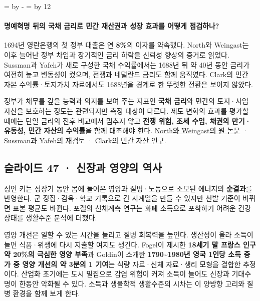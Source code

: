 \documentclass[10pt,a4paper]{article}
\newcommand{\ReserveQuestionSpace}{%
  \par\begingroup
  \dimen0=\pagegoal \advance\dimen0 by -\pagetotal
  \dimen2=\baselineskip \multiply\dimen2 by 12
  \ifdim\dimen0<\dimen2 \newpage\fi
  \endgroup}
\begin{document}
\ReserveQuestionSpace
\paragraph{명예혁명 뒤의 국채 금리로 민간 재산권과 성장 효과를 어떻게 점검하나?}
1694년 영란은행의 첫 정부 대출은 연 \textbf{8\%}의 이자를 약속했다. North와 Weingast는 이후 늘어난 정부 차입과 장기적인 금리 하락을 신뢰성 향상의 증거로 읽었다. Sussman과 Yafeh가 새로 구성한 국채 수익률에서는 1688년 뒤 약 40년 동안 금리가 여전히 높고 변동성이 컸으며, 전쟁과 네덜란드 금리도 함께 움직였다. Clark의 민간 자본 수익률·토지가치 자료에서도 1688년을 경계로 한 뚜렷한 전환은 보이지 않았다.\par

정부가 채무를 갚을 능력과 의지를 보여 주는 지표인 \textbf{국채 금리}와 민간의 토지·사업 자산을 보호하는 정도는 관련되지만 측정 대상이 다르다. 제도 변화의 효과를 평가할 때에는 단일 금리의 전후 비교에서 멈추지 않고 \textbf{전쟁 위험, 조세 수입, 채권의 만기·유동성, 민간 자산의 수익률}을 함께 대조해야 한다. \href{https://cdn-dev.vanderbilt.edu/t2-my-dev/wp-content/uploads/sites/138/2016/12/NorthWeingast-1989-Constitutions-and-Commitment.pdf}{North와 Weingast의 원 논문} · \href{https://economichistory.ucla.edu/wp-content/uploads/sites/69/2017/07/sussman\_and\_yafeh\_2006.pdf}{Sussman과 Yafeh의 재검토} · \href{https://faculty.econ.ucdavis.edu/faculty/gclark/papers/reh.pdf}{Clark의 민간 자산 연구}.\par

\subsection{슬라이드 47 · 신장과 영양의 역사}
성인 키는 성장기 동안 몸에 들어온 영양과 질병·노동으로 소모된 에너지의 \textbf{순결과}를 반영한다. 군 징집·감옥·학교 기록으로 긴 시계열을 만들 수 있지만 선발 기준이 바뀌면 표본 평균도 바뀐다. 포겔의 신체계측 연구는 화폐 소득으로 포착하기 어려운 건강 상태를 생활수준 분석에 더했다.\par

영양 개선은 일할 수 있는 시간을 늘리고 질병 회복력을 높인다. 생산성이 올라 소득이 늘면 식품·위생에 다시 지출할 여지도 생긴다. Fogel이 제시한 \textbf{18세기 말 프랑스 인구 약 20\%의 극심한 영양 부족}과 Goldin이 소개한 \textbf{1790\textasciitilde{}1980년 영국 1인당 소득 증가 중 영양 개선의 약 3분의 1 기여}는 식량 자료·신체 자료·생리 모형을 결합한 추정이다. 산업화 초기에는 도시 밀집으로 감염 위험이 커져 소득이 늘어도 신장과 기대수명이 한동안 악화될 수 있다. 소득과 생물학적 생활수준의 시차는 이 양방향 고리와 질병 환경을 함께 보게 한다.\par
\end{document}
